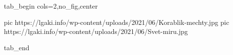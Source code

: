  
 
 
 
 

\ifcmt
  tab_begin cols=2,no_fig,center

     pic https://lgaki.info/wp-content/uploads/2021/06/Korablik-mechty.jpg
		 pic https://lgaki.info/wp-content/uploads/2021/06/Svet-miru.jpg

  tab_end
\fi
